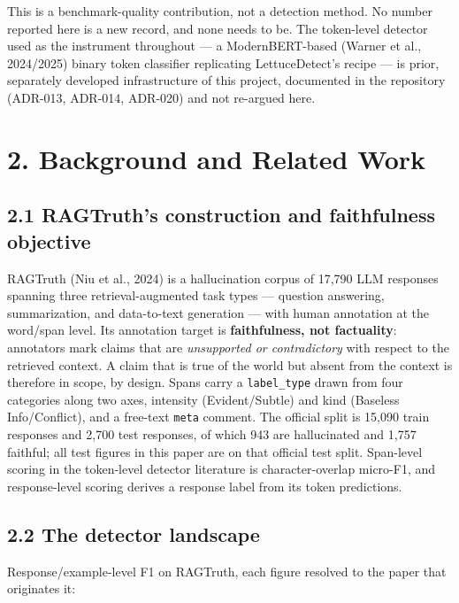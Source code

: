 \documentclass[11pt]{article}
\newcounter{none}
\begin{document}
This is a benchmark-quality contribution, not a detection method. No number reported here
is a new record, and none needs to be. The token-level detector used as the instrument
throughout --- a ModernBERT-based (Warner et al., 2024/2025) binary token classifier
replicating LettuceDetect's recipe --- is prior, separately developed infrastructure of this
project, documented in the repository (ADR-013, ADR-014, ADR-020) and not re-argued here.

\section{2. Background and Related Work}\label{background-and-related-work}

\subsection{2.1 RAGTruth's construction and faithfulness objective}\label{ragtruths-construction-and-faithfulness-objective}

RAGTruth (Niu et al., 2024) is a hallucination corpus of 17,790 LLM responses spanning
three retrieval-augmented task types --- question answering, summarization, and data-to-text
generation --- with human annotation at the word/span level. Its annotation target is
\textbf{faithfulness, not factuality}: annotators mark claims that are \emph{unsupported or
contradictory} with respect to the retrieved context. A claim that is true of the world but
absent from the context is therefore in scope, by design. Spans carry a \texttt{label\_type} drawn
from four categories along two axes, intensity (Evident/Subtle) and kind (Baseless
Info/Conflict), and a free-text \texttt{meta} comment. The official split is 15,090 train
responses and 2,700 test responses, of which 943 are hallucinated and 1,757 faithful; all
test figures in this paper are on that official test split. Span-level scoring in the
token-level detector literature is character-overlap micro-F1, and response-level scoring
derives a response label from its token predictions.

\subsection{2.2 The detector landscape}\label{the-detector-landscape}

Response/example-level F1 on RAGTruth, each figure resolved to the paper that originates it:
\end{document}
